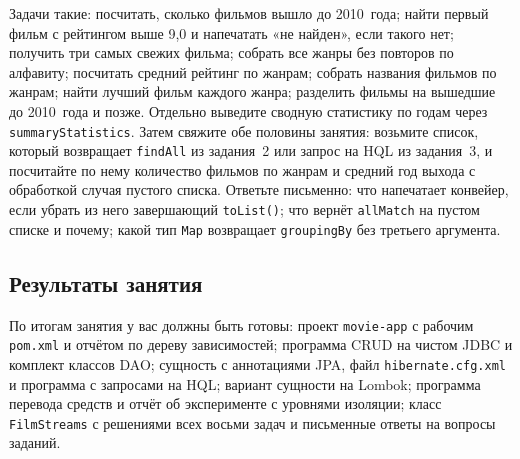 Задачи такие: посчитать, сколько фильмов вышло до 2010~года; найти первый
фильм с рейтингом выше 9,0 и напечатать «не найден», если такого нет;
получить три самых свежих фильма; собрать все жанры без повторов по алфавиту;
посчитать средний рейтинг по жанрам; собрать названия фильмов по жанрам;
найти лучший фильм каждого жанра; разделить фильмы на вышедшие до 2010~года и
позже. Отдельно выведите сводную статистику по годам через
\texttt{summaryStatistics}. Затем свяжите обе половины занятия: возьмите
список, который возвращает \texttt{findAll} из задания~2 или запрос на HQL из
задания~3, и посчитайте по нему количество фильмов по жанрам и средний год
выхода с обработкой случая пустого списка. Ответьте письменно: что напечатает
конвейер, если убрать из него завершающий \texttt{toList()}; что вернёт
\texttt{allMatch} на пустом списке и почему; какой тип \texttt{Map} возвращает
\texttt{groupingBy} без третьего аргумента.

\subsection*{Результаты занятия}

По итогам занятия у вас должны быть готовы: проект \texttt{movie-app} с
рабочим \texttt{pom.xml} и отчётом по дереву зависимостей; программа CRUD на
чистом JDBC и комплект классов DAO; сущность с аннотациями JPA, файл
\texttt{hibernate.cfg.xml} и программа с запросами на HQL; вариант сущности на
Lombok; программа перевода средств и отчёт об эксперименте с уровнями
изоляции; класс \texttt{FilmStreams} с решениями всех восьми задач и
письменные ответы на вопросы заданий.

\kontrolvoprosy

